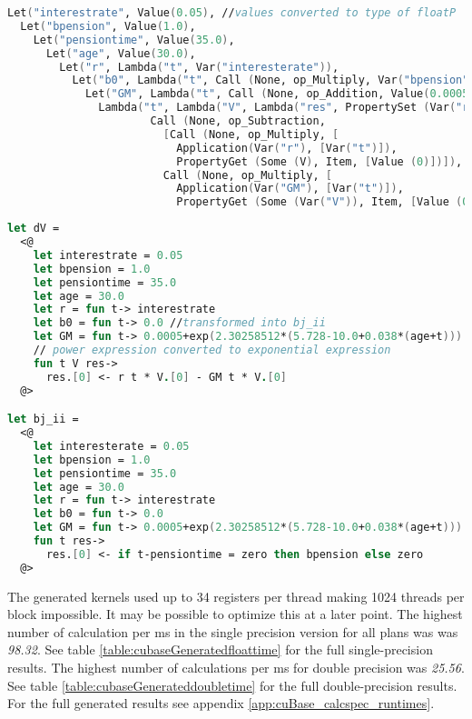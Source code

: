 \begin{lstlisting}[language=fsharp, caption=Quotation AST for dV method generated from CalcSpec AST, label=pe_quote]
Let("interestrate", Value(0.05), //values converted to type of floatP
  Let("bpension", Value(1.0), 
    Let("pensiontime", Value(35.0), 
      Let("age", Value(30.0), 
        Let("r", Lambda("t", Var("interesterate")), 
          Let("b0", Lambda("t", Call (None, op_Multiply, Var("bpension")::[Application(Var("delta"), Call (None, op_Subtraction, Var("t")::[Var("pensiontime")]))])), 
            Let("GM", Lambda("t", Call (None, op_Addition, Value(0.0005)::[...])), 
              Lambda("t", Lambda("V", Lambda("res", PropertySet (Var("res"), Item, [Value (0),
                      Call (None, op_Subtraction,
                        [Call (None, op_Multiply, [
                          Application(Var("r"), [Var("t")]),
                          PropertyGet (Some (V), Item, [Value (0)])]),
                        Call (None, op_Multiply, [
                          Application(Var("GM"), [Var("t")]),
                          PropertyGet (Some (Var("V")), Item, [Value (0)])])])]))))))))))))
\end{lstlisting}

\begin{lstlisting}[language=fsharp, caption=Formatted quotation AST for dV and bj\_ii methods, label=pe_quote_format]
let dV = 
  <@
    let interestrate = 0.05
    let bpension = 1.0
    let pensiontime = 35.0
    let age = 30.0
    let r = fun t-> interestrate
    let b0 = fun t-> 0.0 //transformed into bj_ii
    let GM = fun t-> 0.0005+exp(2.30258512*(5.728-10.0+0.038*(age+t))) 
    // power expression converted to exponential expression
    fun t V res->
      res.[0] <- r t * V.[0] - GM t * V.[0]
  @>

let bj_ii = 
  <@
    let interesterate = 0.05
    let bpension = 1.0
    let pensiontime = 35.0
    let age = 30.0
    let r = fun t-> interestrate
    let b0 = fun t-> 0.0
    let GM = fun t-> 0.0005+exp(2.30258512*(5.728-10.0+0.038*(age+t)))
    fun t res->
      res.[0] <- if t-pensiontime = zero then bpension else zero
  @>
\end{lstlisting}


The generated kernels used up to 34 registers per thread making 1024 threads per block impossible. 
It may be possible to optimize this at a later point.
The highest number of calculation per ms in the single precision version for all plans was was \emph{98.32}.
See table \ref{table:cubaseGeneratedfloattime} for the full single-precision results. 
The highest number of calculations per ms for double precision was \emph{25.56}.
See table \ref{table:cubaseGenerateddoubletime} for the full double-precision results. 
For the full generated results see appendix \ref{app:cuBase_calcspec_runtimes}.

